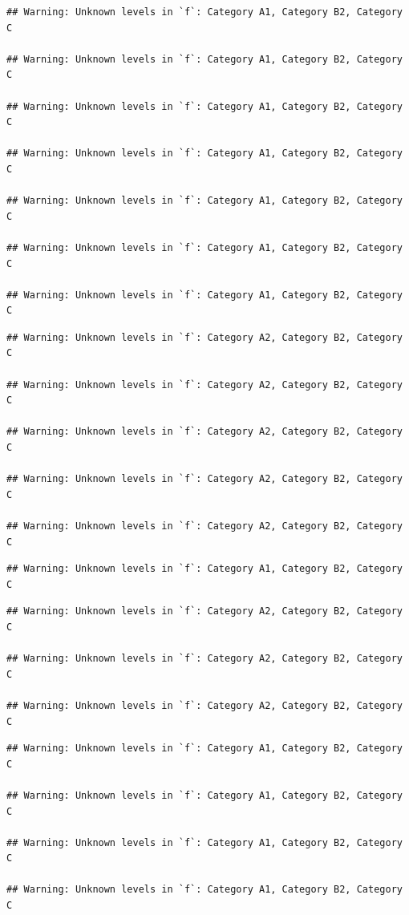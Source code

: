 \documentclass[preprint, 3p,
authoryear]{elsarticle} %
\begin{document}
\begin{verbatim}
## Warning: Unknown levels in `f`: Category A1, Category B2, Category C

## Warning: Unknown levels in `f`: Category A1, Category B2, Category C

## Warning: Unknown levels in `f`: Category A1, Category B2, Category C

## Warning: Unknown levels in `f`: Category A1, Category B2, Category C

## Warning: Unknown levels in `f`: Category A1, Category B2, Category C

## Warning: Unknown levels in `f`: Category A1, Category B2, Category C

## Warning: Unknown levels in `f`: Category A1, Category B2, Category C
\end{verbatim}

\begin{verbatim}
## Warning: Unknown levels in `f`: Category A2, Category B2, Category C

## Warning: Unknown levels in `f`: Category A2, Category B2, Category C

## Warning: Unknown levels in `f`: Category A2, Category B2, Category C

## Warning: Unknown levels in `f`: Category A2, Category B2, Category C

## Warning: Unknown levels in `f`: Category A2, Category B2, Category C
\end{verbatim}

\begin{verbatim}
## Warning: Unknown levels in `f`: Category A1, Category B2, Category C
\end{verbatim}

\begin{verbatim}
## Warning: Unknown levels in `f`: Category A2, Category B2, Category C

## Warning: Unknown levels in `f`: Category A2, Category B2, Category C

## Warning: Unknown levels in `f`: Category A2, Category B2, Category C
\end{verbatim}

\begin{verbatim}
## Warning: Unknown levels in `f`: Category A1, Category B2, Category C

## Warning: Unknown levels in `f`: Category A1, Category B2, Category C

## Warning: Unknown levels in `f`: Category A1, Category B2, Category C

## Warning: Unknown levels in `f`: Category A1, Category B2, Category C
\end{verbatim}
\end{document}
